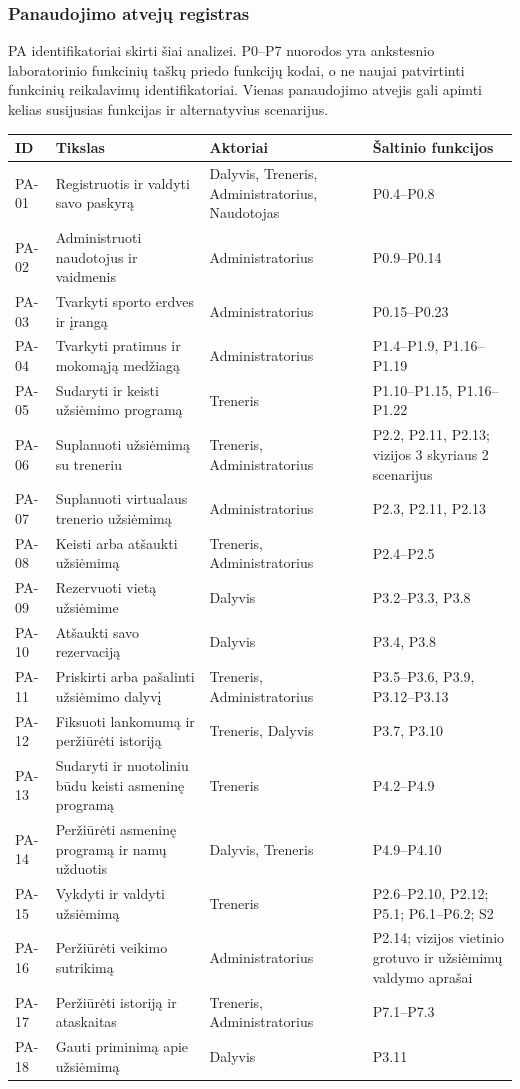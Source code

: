 \subsubsection{Panaudojimo atvejų registras}
PA identifikatoriai skirti šiai analizei. P0--P7 nuorodos yra ankstesnio laboratorinio funkcinių taškų priedo funkcijų kodai, o ne naujai patvirtinti funkcinių reikalavimų identifikatoriai. Vienas panaudojimo atvejis gali apimti kelias susijusias funkcijas ir alternatyvius scenarijus.
\begingroup\small
\begin{longtable}{@{}p{1.2cm}p{6cm}p{3cm}p{4cm}@{}}
\toprule ID & Tikslas & Aktoriai & Šaltinio funkcijos\\\midrule\endhead
PA-01 & Registruotis ir valdyti savo paskyrą & Dalyvis, Treneris, Administratorius, Naudotojas & P0.4--P0.8 \\
PA-02 & Administruoti naudotojus ir vaidmenis & Administratorius & P0.9--P0.14 \\
PA-03 & Tvarkyti sporto erdves ir įrangą & Administratorius & P0.15--P0.23 \\
PA-04 & Tvarkyti pratimus ir mokomąją medžiagą & Administratorius & P1.4--P1.9, P1.16--P1.19 \\
PA-05 & Sudaryti ir keisti užsiėmimo programą & Treneris & P1.10--P1.15, P1.16--P1.22 \\
PA-06 & Suplanuoti užsiėmimą su treneriu & Treneris, Administratorius & P2.2, P2.11, P2.13; vizijos 3 skyriaus 2 scenarijus \\
PA-07 & Suplanuoti virtualaus trenerio užsiėmimą & Administratorius & P2.3, P2.11, P2.13 \\
PA-08 & Keisti arba atšaukti užsiėmimą & Treneris, Administratorius & P2.4--P2.5 \\
PA-09 & Rezervuoti vietą užsiėmime & Dalyvis & P3.2--P3.3, P3.8 \\
PA-10 & Atšaukti savo rezervaciją & Dalyvis & P3.4, P3.8 \\
PA-11 & Priskirti arba pašalinti užsiėmimo dalyvį & Treneris, Administratorius & P3.5--P3.6, P3.9, P3.12--P3.13 \\
PA-12 & Fiksuoti lankomumą ir peržiūrėti istoriją & Treneris, Dalyvis & P3.7, P3.10 \\
PA-13 & Sudaryti ir nuotoliniu būdu keisti asmeninę programą & Treneris & P4.2--P4.9 \\
PA-14 & Peržiūrėti asmeninę programą ir namų užduotis & Dalyvis, Treneris & P4.9--P4.10 \\
PA-15 & Vykdyti ir valdyti užsiėmimą & Treneris & P2.6--P2.10, P2.12; P5.1; P6.1--P6.2; S2 \\
PA-16 & Peržiūrėti veikimo sutrikimą & Administratorius & P2.14; vizijos vietinio grotuvo ir užsiėmimų valdymo aprašai \\
PA-17 & Peržiūrėti istoriją ir ataskaitas & Treneris, Administratorius & P7.1--P7.3 \\
PA-18 & Gauti priminimą apie užsiėmimą & Dalyvis & P3.11 \\
\bottomrule\end{longtable}\endgroup
